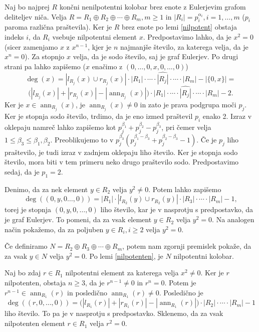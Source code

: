 \documentclass[a4paper, 12pt]{amsart}
\theoremstyle{definition} %
\theoremstyle{plain} %
\DeclareMathOperator{\ann}{ann}
\begin{document}
\proof
Naj bo najprej $R$ končni nenilpotentni kolobar brez enote z Eulerjevim grafom deliteljev niča. Velja $R=R_1\oplus R_2\oplus \cdots \oplus R_m, m\ge 1$ in $|R_i|=p_i^{\alpha_i}, i=1,\dots,m$ ($p_i$ paroma različna praštevila). Ker je $R$ brez enote po lemi \ref{nilpotent} obstaja indeks $i$, da $R_i$ vsebuje nilpotentni element $x$. Predpostavimo lahko, da je $x^2 = 0$ (sicer zamenjamo $x$ z $x^{n-1}$, kjer je $n$ najmanjše število, za katerega velja, da je $x^n=0$). Za stopnjo $x$ velja, da je sodo število, saj je graf Eulerjev. Po  drugi  strani pa lahko zapišemo ($x$ enačimo z $(0,\dots,0,x,0,\dots,0)$)
$$
\deg(x) = |l_{R_j}(x) \cup r_{R_j}(x)|\cdot |R_1|\cdot \cdots \cdot \widehat{|R_j|} \cdot \cdots \cdot |R_m| - |\{0,x\}| = 
$$
$$
\big( |l_{R_j}(x)| + |r_{R_j}(x)| - |\ann_{R_j}(x)| \big)\cdot |R_1| \cdot \cdots \cdot \widehat{|R_j|} \cdot \cdots \cdot |R_m| - 2.
$$
Ker je $x\in \ann_{R_j}(x)$, je $\ann_{R_j}(x)\neq 0$ in zato je prava podgrupa moči $p_j$. Ker je stopnja sodo število, trdimo, da je eno izmed praštevil $p_i$ enako 2. Izraz v oklepaju namreč lahko zapišemo kot $p_j^{ \beta_1} + p_j^{\beta_2} - p_j^{\beta_3}$, pri čemer velja $1\le \beta_3 \le \beta_1,\beta_2$. Preoblikujemo to v $p_j^{\beta_3}(p_j^{\beta_1 - \beta_3} + p_j^{\beta_2 - \beta_3 } -1)$. Če je $p_j$ liho praštevilo, je tudi izraz v zadnjem oklepaju liho število. Ker je stopnja sodo število, mora biti v tem primeru neko drugo praštevilo sodo. Predpostavimo sedaj, da je $p_1 = 2$.

Denimo, da za nek element $y\in R_2$ velja $y^2 \neq 0$. Potem lahko zapišemo
$$
\deg((0,y,0\dots,0)) =  |R_1|\cdot |l_{R_2}(y)\cup r_{R_2}(y)|\cdot |R_3| \cdot \cdots \cdot |R_m| - 1,
$$
torej je stopnja $(0,y,0,\dots,0)$ liho število, kar je v nasprotju s predpostavko, da je graf Eulerjev. To pomeni, da za vsak element $y\in R_2$ velja $y^2 = 0$. Na analogen način pokažemo, da za poljuben $y\in R_i, i\ge 2$ velja $y^2 = 0$. 

Če definiramo $N=R_2 \oplus R_3 \oplus \cdots \oplus R_m$, potem nam zgornji premislek pokaže, da za vsak $y \in N$ velja $y^2 = 0$. Po lemi \ref{nilpotenten}, je $N$ nilpotentni kolobar.

Naj bo zdaj $r\in R_1$ nilpotentni element za katerega velja $x^2  \neq 0$. Ker je $r$ nilpotenten, obstaja $n\ge 3$, da je $r^{n-1}\neq 0$ in $r^n = 0$. Potem je $r^{n-1}\in \ann_{R_1}(r)$ in posledično $\ann_{R_1}(r) \neq 0$. Posledično je 
$$
\deg((r,0,\dots,0)) = \big( |l_{R_1}(r)| + |r_{R_1}(r)| - |\ann_{R_1}(r)| \big)\cdot |R_2| \cdot \cdots \cdot |R_m| - 1
$$
liho število. To pa je v nasprotju s predpostavko. Sklenemo, da za vsak nilpotenten element $r\in R_1$ velja $r^2=0$.
\end{document}

